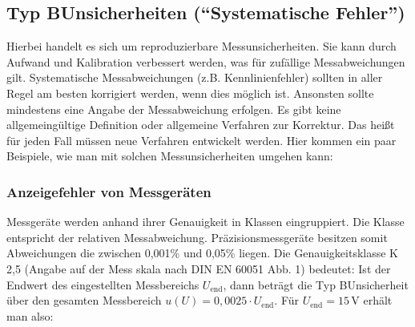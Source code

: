 \documentclass[letterpaper,10pt,english]{jupyterBook}
\begin{document}
\subsection{Typ B\sphinxhyphen{}Unsicherheiten (“Systematische Fehler”)}
\label{\detokenize{content/1_Messunsicherheiten:typ-b-unsicherheiten-systematische-fehler}}
\sphinxAtStartPar
Hierbei handelt es sich um reproduzierbare Messunsicherheiten.
Sie kann durch Aufwand und Kalibration verbessert werden, was  für zufällige Messabweichungen gilt. Systematische Messabweichungen (z.B. Kennlinienfehler) sollten in aller Regel am besten korrigiert werden, wenn dies möglich ist. Ansonsten sollte mindestens eine Angabe der Messabweichung erfolgen.
Es gibt keine allgemeingültige Definition oder allgemeine Verfahren zur Korrektur. Das heißt für jeden Fall müssen neue Verfahren entwickelt werden. Hier kommen ein paar Beispiele, wie man mit solchen  Messunsicherheiten umgehen kann:


\subsubsection{Anzeigefehler von Messgeräten}
\label{\detokenize{content/1_Messunsicherheiten:anzeigefehler-von-messgeraten}}
\sphinxAtStartPar
Messgeräte werden anhand ihrer Genauigkeit in Klassen eingruppiert. Die Klasse entspricht der relativen Messabweichung. Präzisionsmessgeräte besitzen somit Abweichungen die zwischen 0,001\% und 0,05\% liegen. Die Genauigkeitsklasse K 2,5 (Angabe auf der Mess\sphinxhyphen{} skala nach DIN EN 60051 Abb. 1) bedeutet: Ist der Endwert des eingestellten Messbereichs \(U_\mathrm{end}\), dann beträgt die Typ B\sphinxhyphen{}Unsicherheit über den gesamten Messbereich \(u(U) = 0,0025\cdot U_\mathrm{end}\). Für \(U_\mathrm{end} = 15\,\mathrm V\) erhält man also:
\end{document}
